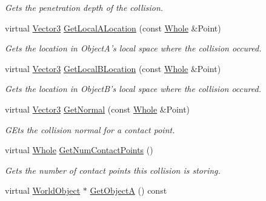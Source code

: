 \begin{DoxyCompactItemize}
\begin{DoxyCompactList}\small\item\em Gets the penetration depth of the collision. \item\end{DoxyCompactList}\item 
virtual \hyperlink{classMezzanine_1_1Vector3}{Vector3} \hyperlink{classMezzanine_1_1Collision_a63a18605e0f34392f8521cdc3afd4b62}{GetLocalALocation} (const \hyperlink{namespaceMezzanine_adcbb6ce6d1eb4379d109e51171e2e493}{Whole} \&Point)
\begin{DoxyCompactList}\small\item\em Gets the location in ObjectA's local space where the collision occured. \item\end{DoxyCompactList}\item 
virtual \hyperlink{classMezzanine_1_1Vector3}{Vector3} \hyperlink{classMezzanine_1_1Collision_a6a75e50b8e2160e356e96080206d60bb}{GetLocalBLocation} (const \hyperlink{namespaceMezzanine_adcbb6ce6d1eb4379d109e51171e2e493}{Whole} \&Point)
\begin{DoxyCompactList}\small\item\em Gets the location in ObjectB's local space where the collision occured. \item\end{DoxyCompactList}\item 
virtual \hyperlink{classMezzanine_1_1Vector3}{Vector3} \hyperlink{classMezzanine_1_1Collision_abd59dc03ed9226275e85681ec3ef1555}{GetNormal} (const \hyperlink{namespaceMezzanine_adcbb6ce6d1eb4379d109e51171e2e493}{Whole} \&Point)
\begin{DoxyCompactList}\small\item\em GEts the collision normal for a contact point. \item\end{DoxyCompactList}\item 
virtual \hyperlink{namespaceMezzanine_adcbb6ce6d1eb4379d109e51171e2e493}{Whole} \hyperlink{classMezzanine_1_1Collision_a75c8f35acf6ceba61b62da0049dcbf1c}{GetNumContactPoints} ()
\begin{DoxyCompactList}\small\item\em Gets the number of contact points this collision is storing. \item\end{DoxyCompactList}\item 
virtual \hyperlink{classMezzanine_1_1WorldObject}{WorldObject} $\ast$ \hyperlink{classMezzanine_1_1Collision_a8eb039baf05fba52609fc9901ec65a4d}{GetObjectA} () const 

\end{DoxyCompactItemize}
